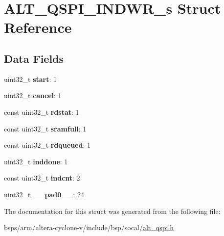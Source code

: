 \hypertarget{structALT__QSPI__INDWR__s}{}\section{A\+L\+T\+\_\+\+Q\+S\+P\+I\+\_\+\+I\+N\+D\+W\+R\+\_\+s Struct Reference}
\label{structALT__QSPI__INDWR__s}
\subsection*{Data Fields}
\begin{DoxyCompactItemize}
\item 
\mbox{\label{structALT__QSPI__INDWR__s_a53bdfcfe195be4bb4612e36f4ec72b35}} 
uint32\+\_\+t {\bfseries start}\+: 1
\item 
\mbox{\label{structALT__QSPI__INDWR__s_a889c89a32bd15699882686fd2dd7e9fd}} 
uint32\+\_\+t {\bfseries cancel}\+: 1
\item 
\mbox{\label{structALT__QSPI__INDWR__s_aabfbab63ea550d9dfef284f915b3af84}} 
const uint32\+\_\+t {\bfseries rdstat}\+: 1
\item 
\mbox{\label{structALT__QSPI__INDWR__s_a37cca29a7cb26670a40d3ccaa400ec82}} 
const uint32\+\_\+t {\bfseries sramfull}\+: 1
\item 
\mbox{\label{structALT__QSPI__INDWR__s_a9f113eaefe2867c65723bb4a846a2c52}} 
const uint32\+\_\+t {\bfseries rdqueued}\+: 1
\item 
\mbox{\label{structALT__QSPI__INDWR__s_a55ab389177f7ce5e75fd84b292173820}} 
uint32\+\_\+t {\bfseries inddone}\+: 1
\item 
\mbox{\label{structALT__QSPI__INDWR__s_a3a9853083252250efcbd21101a654f91}} 
const uint32\+\_\+t {\bfseries indcnt}\+: 2
\item 
\mbox{\label{structALT__QSPI__INDWR__s_a3b85a54e05900ee47c91e024f1419445}} 
uint32\+\_\+t {\bfseries \+\_\+\+\_\+pad0\+\_\+\+\_\+}\+: 24
\end{DoxyCompactItemize}


The documentation for this struct was generated from the following file\+:\begin{DoxyCompactItemize}
\item 
bsps/arm/altera-\/cyclone-\/v/include/bsp/socal/\mbox{\hyperlink{include_2bsp_2socal_2alt__qspi_8h}{alt\+\_\+qspi.\+h}}\end{DoxyCompactItemize}
